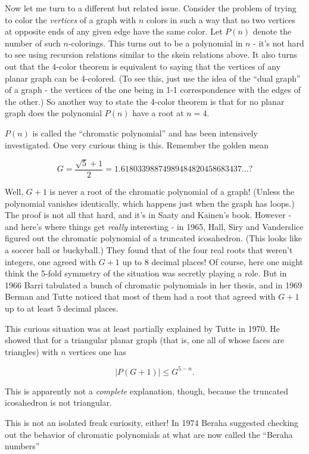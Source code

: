\documentclass{article}
\begin{document}
Now let me turn to a different but related issue. Consider the problem
of trying to color the \emph{vertices} of a graph with \(n\) colors in
such a way that no two vertices at opposite ends of any given edge have
the same color. Let \(P(n)\) denote the number of such \(n\)-colorings.
This turns out to be a polynomial in \(n\) - it's not hard to see using
recursion relations similar to the skein relations above. It also turns
out that the 4-color theorem is equivalent to saying that the vertices
of any planar graph can be 4-colored. (To see this, just use the idea of
the ``dual graph'' of a graph - the vertices of the one being in 1-1
correspondence with the edges of the other.) So another way to state the
4-color theorem is that for no planar graph does the polynomial \(P(n)\)
have a root at \(n = 4\).

\(P(n)\) is called the ``chromatic polynomial'' and has been intensively
investigated. One very curious thing is this. Remember the golden mean

\[G = \frac{\sqrt{5} + 1}{2} = 1.61803398874989484820458683437\ldots?\]

Well, \(G + 1\) is never a root of the chromatic polynomial of a graph!
(Unless the polynomial vanishes identically, which happens just when the
graph has loops.) The proof is not all that hard, and it's in Saaty and
Kainen's book. However - and here's where things get \emph{really}
interesting - in 1965, Hall, Siry and Vanderslice figured out the
chromatic polynomial of a truncated icosahedron. (This looks like a
soccer ball or buckyball.) They found that of the four real roots that
weren't integers, one agreed with \(G + 1\) up to 8 decimal places! Of
course, here one might think the 5-fold symmetry of the situation was
secretly playing a role. But in 1966 Barri tabulated a bunch of
chromatic polynomials in her thesis, and in 1969 Berman and Tutte
noticed that most of them had a root that agreed with \(G + 1\) up to at
least 5 decimal places.

This curious situation was at least partially explained by Tutte in
1970. He showed that for a triangular planar graph (that is, one all of
whose faces are triangles) with \(n\) vertices one has

\[|P(G + 1)| \leqslant G^{5-n}.\]

This is apparently not a \emph{complete} explanation, though, because
the truncated icosahedron is not triangular.

This is not an isolated freak curiosity, either! In 1974 Beraha
suggested checking out the behavior of chromatic polynomials at what are
now called the ``Beraha numbers''
\end{document}
